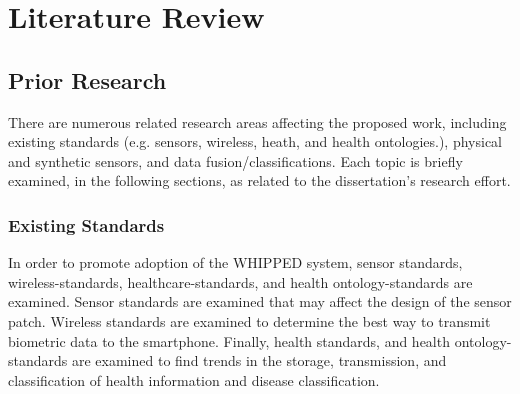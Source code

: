 \chapter{Literature Review}
\label{chap:LitReview}

\section{Prior Research}
\label{sec:priorResearch}
There are numerous related research areas affecting the proposed work, including existing standards (e.g. sensors, wireless, heath, and health ontologies.), physical and synthetic sensors, and data fusion/classifications. Each topic is briefly examined, in the following sections, as related to the dissertation's research effort.

\subsection{Existing Standards}
\label{sebsec:ExistingStandards}
In order to promote adoption of the WHIPPED system, sensor standards, wireless-standards, healthcare-standards, and health ontology-standards are examined. 
Sensor standards are examined that may affect the design of the sensor patch. 
Wireless standards are examined to determine the best way to transmit biometric data to the smartphone. 
Finally, health standards, and health ontology-standards are examined to find trends in the storage, transmission, and classification of health information and disease classification.

